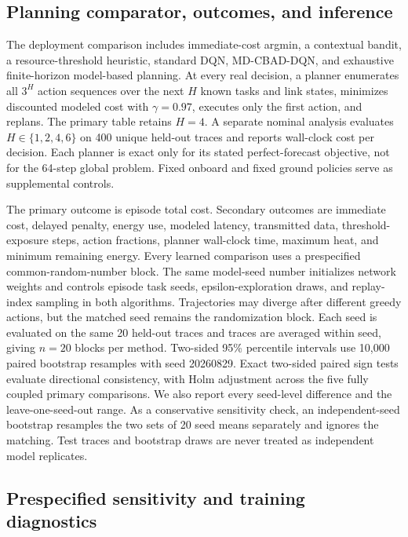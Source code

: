 \documentclass[11pt]{article}
\newcommand{\method}{MD-CBAD-DQN\xspace}
\begin{document}
\subsection{Planning comparator, outcomes, and inference}

The deployment comparison includes immediate-cost argmin, a contextual bandit, a resource-threshold heuristic, standard DQN, \method, and exhaustive finite-horizon model-based planning. At every real decision, a planner enumerates all $3^H$ action sequences over the next $H$ known tasks and link states, minimizes discounted modeled cost with $\gamma=0.97$, executes only the first action, and replans. The primary table retains $H=4$. A separate nominal analysis evaluates $H\in\{1,2,4,6\}$ on 400 unique held-out traces and reports wall-clock cost per decision. Each planner is exact only for its stated perfect-forecast objective, not for the 64-step global problem. Fixed onboard and fixed ground policies serve as supplemental controls.

The primary outcome is episode total cost. Secondary outcomes are immediate cost, delayed penalty, energy use, modeled latency, transmitted data, threshold-exposure steps, action fractions, planner wall-clock time, maximum heat, and minimum remaining energy. Every learned comparison uses a prespecified common-random-number block. The same model-seed number initializes network weights and controls episode task seeds, epsilon-exploration draws, and replay-index sampling in both algorithms. Trajectories may diverge after different greedy actions, but the matched seed remains the randomization block. Each seed is evaluated on the same 20 held-out traces and traces are averaged within seed, giving $n=20$ blocks per method. Two-sided 95\% percentile intervals use 10,000 paired bootstrap resamples with seed 20260829. Exact two-sided paired sign tests evaluate directional consistency, with Holm adjustment across the five fully coupled primary comparisons. We also report every seed-level difference and the leave-one-seed-out range. As a conservative sensitivity check, an independent-seed bootstrap resamples the two sets of 20 seed means separately and ignores the matching. Test traces and bootstrap draws are never treated as independent model replicates.

\subsection{Prespecified sensitivity and training diagnostics}
\end{document}
